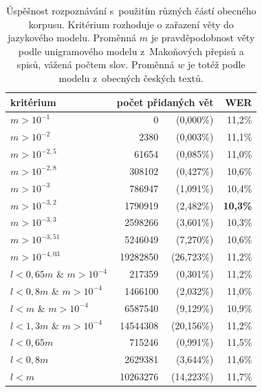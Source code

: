 \begin{table}[htpb]
\begin{center}
\begin{tabular}{|l|r r|r|}
\hline
kritérium & \multicolumn{2}{l|}{počet přidaných vět} & WER \\
\hline
$m>10^{-1}$             &        0 &  (0,000\%) & 11,2\% \\
$m>10^{-2}$             &     2380 &  (0,003\%) & 11,1\% \\
$m>10^{-2,5}$           &    61654 &  (0,085\%) & 11,0\% \\
$m>10^{-2,8}$           &   308102 &  (0,427\%) & 10,6\% \\
$m>10^{-3}$             &   786947 &  (1,091\%) & 10,4\% \\
$m>10^{-3,2}$           &  1790919 &  (2,482\%) & \textbf{10,3\%} \\
$m>10^{-3,3}$           &  2598266 &  (3,601\%) & 10,3\% \\
$m>10^{-3,51}$          &  5246049 &  (7,270\%) & 10,6\% \\
$m>10^{-4,03}$          & 19282850 & (26,723\%) & 11,2\% \\
$l<0,65m$ \& $m>10^{-4}$&   217359 &  (0,301\%) & 11,2\% \\
$l<0,8m$ \& $m>10^{-4}$ &  1466100 &  (2,032\%) & 11,0\% \\
$l<m$ \& $m>10^{-4}$    &  6587540 &  (9,129\%) & 10,9\% \\
$l<1,3m$ \& $m>10^{-4}$ & 14544308 & (20,156\%) & 11,2\% \\
$l<0,65m$               &   715246 &  (0,991\%) & 11,5\% \\
$l<0,8m$                &  2629381 &  (3,644\%) & 11,6\% \\
$l<m$                   & 10263276 & (14,223\%) & 11,7\% \\
\hline
\end{tabular}
\caption{Úspěšnost rozpoznávání s~použitím různých částí obecného korpusu.
Kritérium rozhoduje o zařazení věty do jazykového modelu. Proměnná $m$ je
pravděpodobnost věty podle unigramového modelu z~Makoňových přepisů a spisů,
vážená počtem slov. Proměnná $w$ je totéž podle modelu z~obecných českých textů.}\label{tab:lm-plz-scores}
\end{center}
\end{table}

